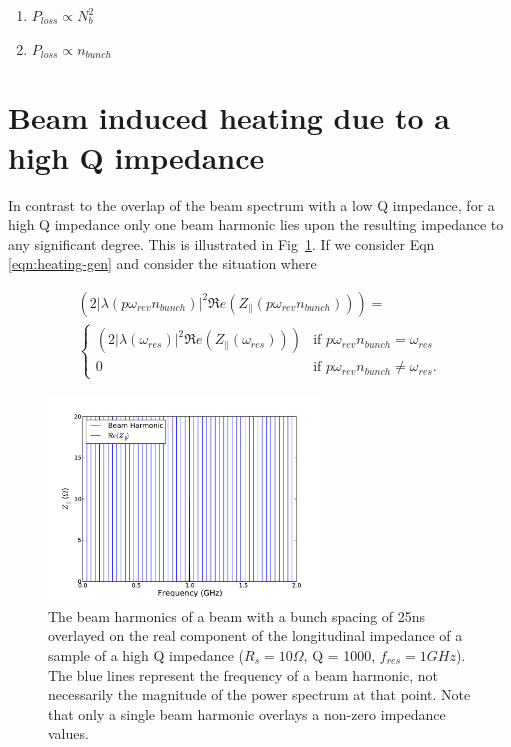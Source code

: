 \documentclass{cernyrep}
\begin{document}
\begin{enumerate}
\item{$P_{loss} \propto N_{b}^{2}$}
\item{$P_{loss} \propto n_{bunch}$}
\end{enumerate}

\section{Beam induced heating due to a high Q impedance}

In contrast to the overlap of the beam spectrum with a low Q impedance, for a high Q impedance only one beam harmonic lies upon the resulting impedance to any significant degree. This is illustrated in Fig~\ref{fig:high_q_harmonics}. If we consider Eqn \ref{eqn:heating-gen} and consider the situation where

\begin{align}
\left( 2 \left| \lambda \left(p \omega_{rev}n_{bunch} \right)  \right|^{2}  \Re{}e \left( Z_{\parallel} \left(p \omega_{rev}n_{bunch}\right) \right) \right) = \nonumber \\
\begin{cases}
\left( 2 \left| \lambda \left( \omega_{res} \right)  \right|^{2}  \Re{}e \left( Z_{\parallel} \left( \omega_{res} \right) \right) \right) &\textrm{if $p \omega_{rev} n_{bunch} = \omega_{res}$}\\
0								&\textrm{if $p \omega_{rev} n_{bunch} \neq \omega_{res}$}.
\end{cases}
\label{eqn:single_harmonic_profile}
\end{align}

\begin{figure}
\begin{center}
\includegraphics[width=0.65\textwidth]{figures/high_q_1000_resonance_beam_harmonics.pdf}
\end{center}
\caption{The beam harmonics of a beam with a bunch spacing of 25ns overlayed on the real component of the longitudinal impedance of a sample of a high Q impedance ($R_{s}=10\Omega$, Q = 1000, $f_{res}=1GHz$). The blue lines represent the frequency of a beam harmonic, not necessarily the magnitude of the power spectrum at that point. Note that only a single beam harmonic overlays a non-zero impedance values.}
\label{fig:high_q_harmonics}
\end{figure}
\end{document}
